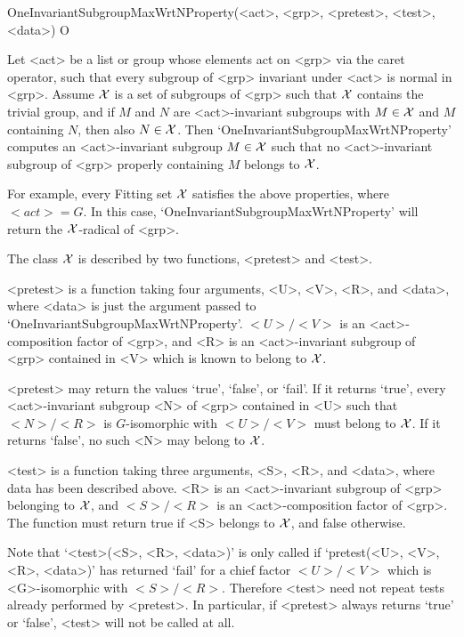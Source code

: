 

\>OneInvariantSubgroupMaxWrtNProperty(<act>, <grp>, <pretest>, <test>, <data>) O

Let <act> be a list or group whose elements act on <grp> via the caret operator,
such that every subgroup of <grp> invariant under <act> is normal in <grp>. 
Assume $\cal X$ is a set of subgroups of <grp>  such that $\cal X$ contains the trivial group,
and if $M$ and $N$ are <act>-invariant subgroups with $M \in \cal X$ and $M$ containing $N$,
then also $N \in \cal X$. Then 
`OneInvariantSubgroupMaxWrtNProperty' computes an <act>-invariant subgroup $M \in
\cal X$ such that no <act>-invariant subgroup of <grp> properly containing $M$ belongs to $\cal
X$. 

For example, every Fitting set $\cal X$ satisfies the above properties, where $<act> = G$. In
this case, `OneInvariantSubgroupMaxWrtNProperty' will return the $\cal
X$-radical of <grp>.

The class $\cal X$ is described by two functions, <pretest> and <test>. 

<pretest> is a function taking four arguments, <U>, <V>, <R>, and <data>,
where <data> is just the argument passed to
`OneInvariantSubgroupMaxWrtNProperty'. $<U>/<V>$ is an <act>-composition factor of
<grp>, and  <R> is an <act>-invariant subgroup of <grp> contained in <V> which is known to
belong to
$\cal X$.

<pretest> may return the values `true', `false', or `fail'. If it returns 
`true', every <act>-invariant subgroup <N> of <grp> contained in <U> such that
$<N>/<R>$ is 
$G$-isomorphic with $<U>/<V>$ must belong to $\cal X$. If it returns `false',
no such <N> may belong to $\cal X$. 

<test> is a function taking three arguments, <S>, <R>, and <data>, where
data has been described above. <R> is an <act>-invariant subgroup of <grp> belonging to
$\cal X$, and $<S>/<R>$ is an <act>-composition factor of <grp>. The function must return
true if <S> belongs to $\cal X$, and false otherwise. 

Note that `<test>(<S>, <R>, <data>)' is only called if `pretest(<U>, <V>,
<R>, <data>)' has returned `fail' for a chief factor $<U>/<V>$ which is
<G>-isomorphic with $<S>/<R>$. Therefore <test> need not repeat tests
already performed by <pretest>. In particular, if <pretest> always returns
`true' or `false', <test> will not be called at all.

